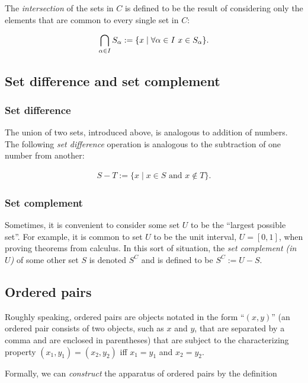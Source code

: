 The \textit{intersection} of the sets in $C$ is defined to be the result of considering only the elements that are common to every single set in $C$:

\begin{align*}
    \bigcap_{\alpha \in I} S_\alpha := \{ x \mid \forall \alpha \in I \text{ } x \in S_\alpha \}.
\end{align*}

\subsection*{Set difference and set complement}

\subsubsection*{Set difference}

The union of two sets, introduced above, is analogous to addition of numbers. The following \textit{set difference} operation is analogous to the subtraction of one number from another:

\begin{align*}
    S - T := \{ x \mid x \in S \text{ and } x \notin T \}.
\end{align*}

\subsubsection*{Set complement}

Sometimes, it is convenient to consider some set $U$ to be the ``largest possible set''. For example, it is common to set $U$ to be the unit interval, $U = [0, 1]$, when proving theorems from calculus. In this sort of situation, the \textit{set complement (in $U$)} of some other set $S$ is denoted $S^C$ and is defined to be $S^C := U - S$.

\subsection*{Ordered pairs}

Roughly speaking, ordered pairs are objects notated in the form ``$(x, y)$'' (an ordered pair consists of two objects, such as $x$ and $y$, that are separated by a comma and are enclosed in parentheses) that are subject to the characterizing property $(x_1, y_1) = (x_2, y_2)$ iff $x_1 = y_1$ and $x_2 = y_2$. 

Formally, we can \textit{construct} the apparatus of ordered pairs by the definition

